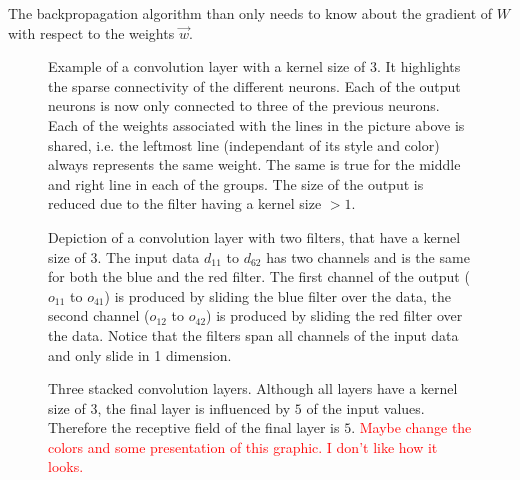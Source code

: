 The backpropagation algorithm than only needs to know about the gradient of $W$ with respect to the weights $\vec{w}$.
\begin{figure}
\centering

\caption[Convolution 1D]{Example of a convolution layer with a kernel size of $3$. It highlights the sparse connectivity of the different neurons. Each of the output neurons is now only connected to three of the previous neurons. Each of the weights associated with the lines in the picture above is shared, i.e. the leftmost line (independant of its style and color) always represents the same weight. The same is true for the middle and right line in each of the groups. The size of the output is reduced due to the filter having a kernel size $>1$.}\label{fig:simple_convolution}
\end{figure}
\begin{figure}
\centering

\caption[Convolution with multiple channels]{Depiction of a convolution layer with two filters, that have a kernel size of $3$. The input data $d_{11}$ to $d_{62}$ has two channels and is the same for both the blue and the red filter. The first channel of the output ($o_{11}$ to $o_{41}$) is produced by sliding the blue filter over the data, the second channel ($o_{12}$ to $o_{42}$) is produced by sliding the red filter over the data. Notice that the filters span all channels of the input data and only slide in 1 dimension.}\label{fig:convolution_channels}
\end{figure}
\begin{figure}
\centering

\caption[Receptive field]{Three stacked convolution layers. Although all layers have a kernel size of $3$, the final layer is influenced by $5$ of the input values. Therefore the receptive field of the final layer is $5$. \textcolor{red}{Maybe change the colors and some presentation of this graphic. I don't like how it looks.}}\label{fig:receptive_field}
\end{figure}

